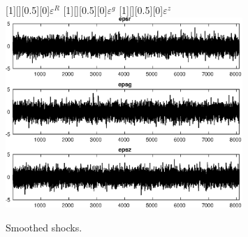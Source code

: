  
\begin{figure}[H]
[1][][0.5][0]{$ {\varepsilon^R} $}
[1][][0.5][0]{$ {\varepsilon^g} $}
[1][][0.5][0]{$ {\varepsilon^z} $}
\centering 
\includegraphics[width=0.80\textwidth]{AnSchoModTheBuilder_SmoothedShocks1}
\caption{Smoothed shocks.}\label{Fig:SmoothedShocks:1}
\end{figure}


